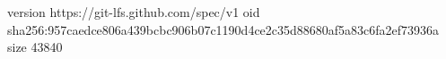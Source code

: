 version https://git-lfs.github.com/spec/v1
oid sha256:957caedce806a439bcbc906b07c1190d4ce2c35d88680af5a83c6fa2ef73936a
size 43840
